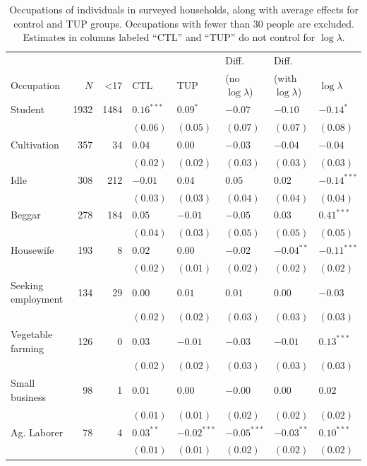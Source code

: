 \documentclass[11pt]{article}
\begin{document}
\begin{table}[htb]
\caption{\label{tab:occupation}Occupations of individuals in surveyed households, along with average effects for control and TUP groups.  Occupations with fewer than 30 people are excluded.  Estimates in columns labeled ``CTL'' and ``TUP'' do not control for $\log\lambda$.}
\centering
\begin{tabular}{lrrlllll}
 &  &  &  &  & Diff. & Diff. & \\
Occupation & $N$ & <17 & CTL & TUP & (no $\log\lambda$) & (with $\log\lambda$) & $\log\lambda$\\
\hline
Student & 1932 & 1484 & $0.16^{***}$ & $0.09^{*}$ & $-0.07$ & $-0.10$ & $-0.14^{*}$\\
 &  &  & $(0.06)$ & $(0.05)$ & $(0.07)$ & $(0.07)$ & $(0.08)$\\
Cultivation & 357 & 34 & $0.04$ & $0.00$ & $-0.03$ & $-0.04$ & $-0.04$\\
 &  &  & $(0.02)$ & $(0.02)$ & $(0.03)$ & $(0.03)$ & $(0.03)$\\
Idle & 308 & 212 & $-0.01$ & $0.04$ & $0.05$ & $0.02$ & $-0.14^{***}$\\
 &  &  & $(0.03)$ & $(0.03)$ & $(0.04)$ & $(0.04)$ & $(0.04)$\\
Beggar & 278 & 184 & $0.05$ & $-0.01$ & $-0.05$ & $0.03$ & $0.41^{***}$\\
 &  &  & $(0.04)$ & $(0.03)$ & $(0.05)$ & $(0.05)$ & $(0.05)$\\
Housewife & 193 & 8 & $0.02$ & $0.00$ & $-0.02$ & $-0.04^{**}$ & $-0.11^{***}$\\
 &  &  & $(0.02)$ & $(0.01)$ & $(0.02)$ & $(0.02)$ & $(0.02)$\\
Seeking employment & 134 & 29 & $0.00$ & $0.01$ & $0.01$ & $0.00$ & $-0.03$\\
 &  &  & $(0.02)$ & $(0.02)$ & $(0.03)$ & $(0.03)$ & $(0.03)$\\
Vegetable farming & 126 & 0 & $0.03$ & $-0.01$ & $-0.03$ & $-0.01$ & $0.13^{***}$\\
 &  &  & $(0.02)$ & $(0.02)$ & $(0.03)$ & $(0.03)$ & $(0.03)$\\
Small business & 98 & 1 & $0.01$ & $0.00$ & $-0.00$ & $0.00$ & $0.02$\\
 &  &  & $(0.01)$ & $(0.01)$ & $(0.02)$ & $(0.02)$ & $(0.02)$\\
Ag. Laborer & 78 & 4 & $0.03^{**}$ & $-0.02^{***}$ & $-0.05^{***}$ & $-0.03^{**}$ & $0.10^{***}$\\
 &  &  & $(0.01)$ & $(0.01)$ & $(0.02)$ & $(0.02)$ & $(0.02)$\\

\end{tabular}
\end{table}
\end{document}
